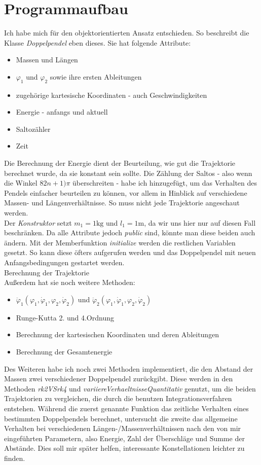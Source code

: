 \documentclass[12pt,a4paper,titlepage,headinclude,bibtotoc]{scrartcl}
\begin{document}
\section{Programmaufbau}
Ich habe mich für den objektorientierten Ansatz entschieden.
So beschreibt die Klasse \textit{Doppelpendel} eben dieses. 
Sie hat folgende Attribute:
\begin{itemize}
	\item Massen und Längen	
	\item $\varphi_1$ und $\varphi_2$ sowie ihre ersten Ableitungen
	\item zugehörige kartesische Koordinaten - auch Geschwindigkeiten
	\item Energie - anfangs und aktuell
	\item Saltozähler
	\item Zeit
\end{itemize}
Die Berechnung der Energie dient der Beurteilung, wie gut die Trajektorie berechnet wurde, da sie konstant sein sollte.
Die Zählung der Saltos - also wenn die Winkel $82n+1)\pi$ überschreiten - habe ich hinzugefügt, um das Verhalten des Pendels einfacher beurteilen zu können, vor allem in Hinblick auf verschiedene Massen- und Längenverhältnisse.
So muss nicht jede Trajektorie angeschaut werden.\\
Der \textit{Konstruktor} setzt $m_1=1\si{\kilo\gram}$ und $l_1=1\si{\meter}$, da wir uns hier nur auf diesen Fall beschränken.
Da alle Attribute jedoch \textit{public} sind, könnte man diese beiden auch ändern.
Mit der Memberfunktion \textit{initialize} werden die restlichen Variablen gesetzt.
So kann diese öfters aufgerufen werden und das Doppelpendel mit neuen Anfangsbedingungen gestartet werden.\\
Berechnung der Trajektorie\\
Außerdem hat sie noch weitere Methoden:
\begin{itemize}
	\item $\ddot{\varphi}_1\left(\varphi_1, \dot{\varphi}_1,\varphi_2, \dot{\varphi}_2\right)$ und $\ddot{\varphi}_2\left(\varphi_1, \dot{\varphi}_1,\varphi_2, \dot{\varphi}_2\right)$
	\item Runge-Kutta 2. und 4.Ordnung
	\item Berechnung der kartesischen Koordinaten und deren Ableitungen
	\item Berechnung der Gesamtenergie
\end{itemize}

Des Weiteren habe ich noch zwei Methoden implementiert, die den Abstand der Massen zwei verschiedener Doppelpendel zurückgibt.
Diese werden in den Methoden \textit{rk2VSrk4} und \textit{variiereVerhaeltnisseQuantitativ} genutzt, um die beiden Trajektorien zu vergleichen, die durch die benutzen Integrationsverfahren entstehen.
Während die zuerst genannte Funktion das zeitliche Verhalten eines bestimmten Doppelpendels berechnet, untersucht die zweite das allgemeine Verhalten bei verschiedenen Längen-/Massenverhältnissen nach den von mir eingeführten Parametern, also Energie, Zahl der Überschläge und Summe der Abstände.
Dies soll mir später helfen, interessante Konstellationen leichter zu finden.
\end{document}
